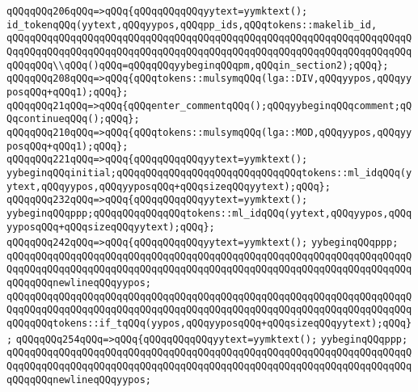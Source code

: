 \verb|qQQqqQQq206qQQq=>qQQq{qQQqqQQqqQQqyytext=yymktext();|\newline
\verb|id_tokenqQQq(yytext,qQQqyypos,qQQqpp_ids,qQQqtokens::makelib_id,|\newline
\verb|qQQqqQQqqQQqqQQqqQQqqQQqqQQqqQQqqQQqqQQqqQQqqQQqqQQqqQQqqQQqqQQqqQQqqQQqqQQqqQQqqQQqqQQqqQQqqQQqqQQqqQQqqQQqqQQqqQQqqQQqqQQqqQQqqQQqqQQqqQQqqQQqqQQq\\qQQq()qQQq=qQQqqQQqyybeginqQQqpm,qQQqin_section2);qQQq};|\newline
\verb|qQQqqQQq208qQQq=>qQQq{qQQqtokens::mulsymqQQq(lga::DIV,qQQqyypos,qQQqyyposqQQq+qQQq1);qQQq};|\newline
\verb|qQQqqQQq21qQQq=>qQQq{qQQqenter_commentqQQq();qQQqyybeginqQQqcomment;qQQqcontinueqQQq();qQQq};|\newline
\verb|qQQqqQQq210qQQq=>qQQq{qQQqtokens::mulsymqQQq(lga::MOD,qQQqyypos,qQQqyyposqQQq+qQQq1);qQQq};|\newline
\verb|qQQqqQQq221qQQq=>qQQq{qQQqqQQqqQQqyytext=yymktext();|\newline
\verb|yybeginqQQqinitial;qQQqqQQqqQQqqQQqqQQqqQQqqQQqqQQqtokens::ml_idqQQq(yytext,qQQqyypos,qQQqyyposqQQq+qQQqsizeqQQqyytext);qQQq};|\newline
\verb|qQQqqQQq232qQQq=>qQQq{qQQqqQQqqQQqyytext=yymktext();|\newline
\verb|yybeginqQQqppp;qQQqqQQqqQQqqQQqtokens::ml_idqQQq(yytext,qQQqyypos,qQQqyyposqQQq+qQQqsizeqQQqyytext);qQQq};|\newline
\verb|qQQqqQQq242qQQq=>qQQq{qQQqqQQqqQQqyytext=yymktext();|\newline
\verb|yybeginqQQqppp;|\newline
\verb|qQQqqQQqqQQqqQQqqQQqqQQqqQQqqQQqqQQqqQQqqQQqqQQqqQQqqQQqqQQqqQQqqQQqqQQqqQQqqQQqqQQqqQQqqQQqqQQqqQQqqQQqqQQqqQQqqQQqqQQqqQQqqQQqqQQqqQQqqQQqqQQqqQQqnewlineqQQqyypos;|\newline
\verb|qQQqqQQqqQQqqQQqqQQqqQQqqQQqqQQqqQQqqQQqqQQqqQQqqQQqqQQqqQQqqQQqqQQqqQQqqQQqqQQqqQQqqQQqqQQqqQQqqQQqqQQqqQQqqQQqqQQqqQQqqQQqqQQqqQQqqQQqqQQqqQQqqQQqtokens::if_tqQQq(yypos,qQQqyyposqQQq+qQQqsizeqQQqyytext);qQQq};|\newline
\verb|qQQqqQQq254qQQq=>qQQq{qQQqqQQqqQQqyytext=yymktext();|\newline
\verb|yybeginqQQqppp;|\newline
\verb|qQQqqQQqqQQqqQQqqQQqqQQqqQQqqQQqqQQqqQQqqQQqqQQqqQQqqQQqqQQqqQQqqQQqqQQqqQQqqQQqqQQqqQQqqQQqqQQqqQQqqQQqqQQqqQQqqQQqqQQqqQQqqQQqqQQqqQQqqQQqqQQqqQQqnewlineqQQqyypos;|\newline

